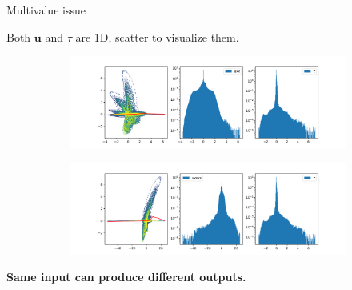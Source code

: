 \documentclass[aspectratio=169]{beamer}
\begin{document}
\begin{frame}{Multivalue issue}

	Both $\mathbf{u}$ and $\tau$ are 1D, scatter to visualize them.
	\begin{figure}[ht]
		\centering
		\begin{subfigure}[b]{\textwidth}
			\centering
			\includegraphics[width=.7\textwidth]
			{fig/regression_uxx_tau_err_scatter.png}
		\end{subfigure}
		\begin{subfigure}[b]{\textwidth}
			\centering
			\includegraphics[width=.7\textwidth]
			{fig/regression_uxxxx_tau_err_scatter.png}
		\end{subfigure}
	\end{figure}

	\textbf{\color{red} Same input can produce different outputs.}
\end{frame}


\end{document}
